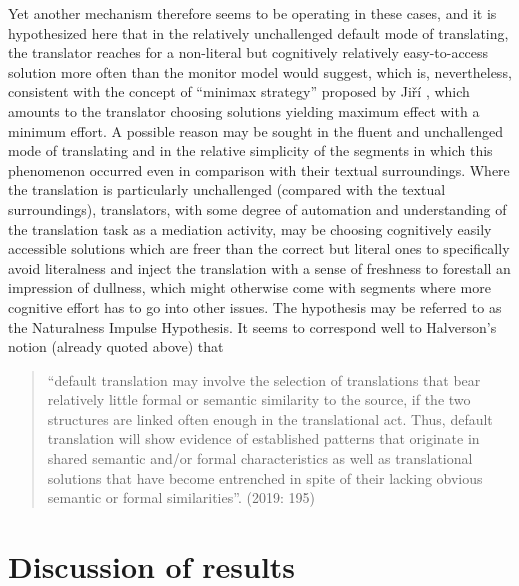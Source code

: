 \documentclass[output=paper]{langscibook}
\begin{document}
{ Yet another mechanism therefore seems to be operating in these cases, and it is hypothesized here that in the relatively unchallenged default mode of translating, the translator reaches for a non-literal but cognitively relatively easy-to-access solution more often than the monitor model would suggest, which is, nevertheless, consistent with the concept of “minimax strategy” proposed by Jiří \citet[1179]{Levy1967}, which amounts to the translator choosing solutions yielding maximum effect with a minimum effort. A possible reason may be sought in the fluent and unchallenged mode of translating and in the relative simplicity of the segments in which this phenomenon occurred even in comparison with their textual surroundings. Where the translation is particularly unchallenged (compared with the textual surroundings), translators, with some degree of automation and understanding of the translation task as a mediation activity, may be choosing cognitively easily accessible solutions which are freer than the correct but literal ones to specifically avoid literalness and inject the translation with a sense of freshness to forestall an impression of dullness, which might otherwise come with segments where more cognitive effort has to go into other issues.} The hypothesis may be referred to as the Naturalness Impulse Hypothesis. It seems to correspond well to Halverson’s notion (already quoted above) that \begin{quote}“default translation may involve the selection of translations that bear relatively little formal or semantic similarity to the source, if the two structures are linked often enough in the translational act. Thus, default translation will show evidence of established patterns that originate in shared semantic and/or formal characteristics as well as translational solutions that have become entrenched in spite of their lacking obvious semantic or formal similarities”. (2019: 195)\end{quote}

\section{Discussion of results}\label{sec:kamenicka:discussion}
\end{document}
